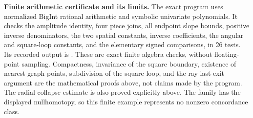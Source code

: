 \textbf{Finite arithmetic certificate and its limits.}
The exact program
uses normalized BigInt rational arithmetic and symbolic univariate
polynomials. It checks the amplitude identity, four piece joins,
all endpoint slope bounds, positive inverse denominators, the two
spatial constants, inverse coefficients, the angular and square-loop
constants, and the elementary signed comparisons, in 26 tests.
Its recorded output is
.
These are exact finite algebra checks, without floating-point
sampling. Compactness, invariance of the square boundary, existence
of nearest graph points, subdivision of the square loop, and the
ray last-exit argument are the mathematical proofs above, not
claims made by the program. The radial-collapse estimate is also
proved explicitly above. The family has the displayed nullhomotopy,
so this finite example represents no nonzero concordance class.

